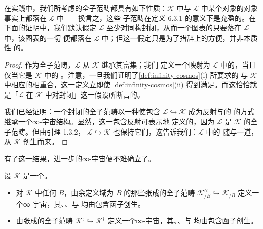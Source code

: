在实践中，我们所考虑的全子范畴都具有如下性质：$\mathcal{K}$ 中与 $\mathcal{L}$
中某个对象\trEquivalence{}的对象事实上都落在 $\mathcal{L}$ 中——换言之，这些
子范畴在定义 6.3.1 的意义下是充盈的。在下面的证明中，我们默认假定 $\mathcal{L}$
至少对同构封闭，从而一个图表的\trLimit{}只要落在 $\mathcal{L}$ 中，该图表的一切%
\trLimit{}便都落在 $\mathcal{L}$ 中；但这一假定只是为了措辞上的方便，并非本质性
的。

\begin{proof}
作为全子范畴，$\mathcal{L}$ 从 $\mathcal{K}$ 继承其\trQuasiCategory{}富集；我们
定义一个映射为 $\mathcal{L}$ 中的\trIsofibration，当且仅当它是 $\mathcal{K}$ 中的%
\trIsofibration。注意，一旦我们证明了\cref{def:infinity-cosmos}(i) 所要求的%
\trLimit{}与 $\mathcal{K}$ 中相应的\trLimit{}相重合，这一定义立即使
\cref{def:infinity-cosmos}(ii) 得到满足。而这恰恰就是「$\mathcal{L}$ 在
$\mathcal{K}$ 中对\trCosmologicalLimitNotions{}封闭」这一假设所断言的。

我们已经证明：一个封闭的全子范畴以一种使包含 $\mathcal{L}\hookrightarrow\mathcal{K}$
成为反射\trIsofibration{}与\trCosmologicalLimitNotions{}的%
\trCosmologicalFunctor{}的方式继承一个∞-宇宙结构。显然，这一包含反射可表示地
定义的\trEquivalence，因为
$\mathcal{L}$ 是 $\mathcal{K}$ 的全子范畴。但由引理 1.3.2，\trCosmologicalFunctor{}
$\mathcal{L}\hookrightarrow\mathcal{K}$ 也保持它们，这告诉我们：$\mathcal{L}$ 中的%
\trEquivalence{}随\trIsofibration{}与\trCosmologicalLimitNotions{}一道，从
$\mathcal{K}$ 创生而来。
\end{proof}

有了这一结果，进一步的∞-宇宙便不难确立了。

\begin{proposition}[平凡纤维化的∞-宇宙]\label{prop:trivial-fibration-cosmoi}
设 $\mathcal{K}$ 是一个\trInfinityCosmos。
\begin{itemize}
\item[(i)] 对 $\mathcal{K}$ 中任何\trInfinityCategory{} $B$，由余定义域为 $B$
的那些\trTrivialFibration{}张成的全子范畴
$\mathcal{K}^{\approx}_{/B}\hookrightarrow\mathcal{K}_{/B}$
定义一个∞-宇宙，其\trLimit、\trIsofibration、\trEquivalence{}与%
\trTrivialFibration{}均由包含函子创生。
\item[(ii)] 由\trTrivialFibration{}张成的全子范畴
$\mathcal{K}^{\natural}\hookrightarrow\mathcal{K}^{\dagger}$
定义一个∞-宇宙，其\trLimit、\trIsofibration、\trEquivalence{}与%
\trTrivialFibration{}均由包含函子创生。
\end{itemize}
\end{proposition}

